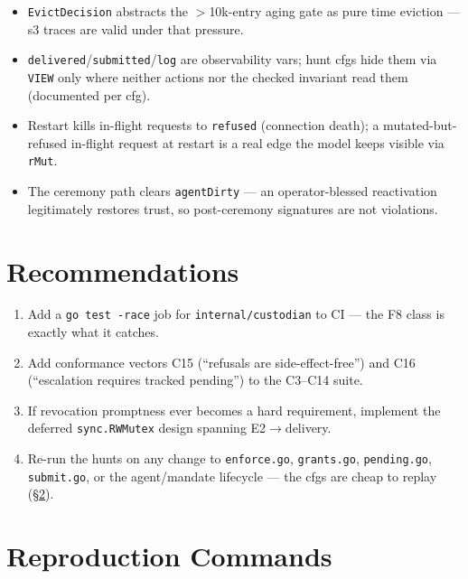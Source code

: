 \documentclass[11pt]{article}
\newcommand{\code}[1]{\texttt{#1}}
\newcommand{\file}[1]{\texttt{#1}}
\begin{document}
\begin{itemize}[nosep]
  \item \code{EvictDecision} abstracts the $>$10k-entry aging gate as pure time
        eviction — s3 traces are valid under that pressure.
  \item \code{delivered}/\code{submitted}/\code{log} are observability vars;
        hunt cfgs hide them via \code{VIEW} only where neither actions nor the
        checked invariant read them (documented per cfg).
  \item Restart kills in-flight requests to \code{refused} (connection death);
        a mutated-but-refused in-flight request at restart is a real edge the
        model keeps visible via \code{rMut}.
  \item The ceremony path clears \code{agentDirty} — an operator-blessed
        reactivation legitimately restores trust, so post-ceremony signatures
        are not violations.
\end{itemize}

\section{Recommendations}

\begin{enumerate}[nosep]
  \item Add a \code{go test -race} job for \code{internal/custodian} to CI —
        the F8 class is exactly what it catches.
  \item Add conformance vectors C15 (``refusals are side-effect-free'') and
        C16 (``escalation requires tracked pending'') to the C3--C14 suite.
  \item If revocation promptness ever becomes a hard requirement, implement
        the deferred \code{sync.RWMutex} design spanning E2$\to$delivery.
  \item Re-run the hunts on any change to \file{enforce.go}, \file{grants.go},
        \file{pending.go}, \file{submit.go}, or the agent/mandate lifecycle —
        the cfgs are cheap to replay (\S\ref{sec:appendix}).
\end{enumerate}

\appendix
\section{Reproduction Commands}
\label{sec:appendix}
\end{document}
